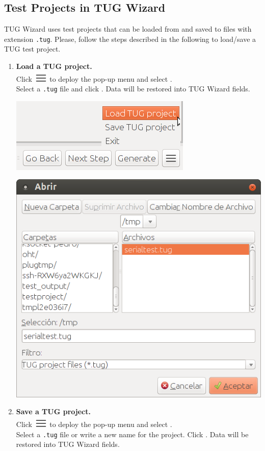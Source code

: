 
\subsection{Test Projects in TUG Wizard}

TUG Wizard uses test projects that can be loaded from and saved to
files with extension {\tt *.tug}. Please, follow the steps described
in the following to load/save a TUG test project.

\begin{enumerate}
%
\item {\bf Load a TUG project.}\\
%
  Click \includegraphics[width=.05\textwidth]{images/menu_icon.png} to
  deploy the pop-up menu and select .\\
%
  Select a {\tt *.tug} file and click . Data will be
  restored into TUG Wizard fields.


\vspace{1ex}
\includegraphics[width=.5\textwidth]{images/tug_load.png}

\vspace{1ex}
\includegraphics[width=.7\textwidth]{images/tug_load2.png}
\vspace{3ex}
\newpage

%
\item {\bf Save a TUG project.}\\
%
  Click \includegraphics[width=.05\textwidth]{images/menu_icon.png}
  to deploy the pop-up menu and select .\\
%
  Select a {\tt *.tug} file or write a new name for the project. Click
  . Data will be restored into TUG Wizard fields.



\end{enumerate}
